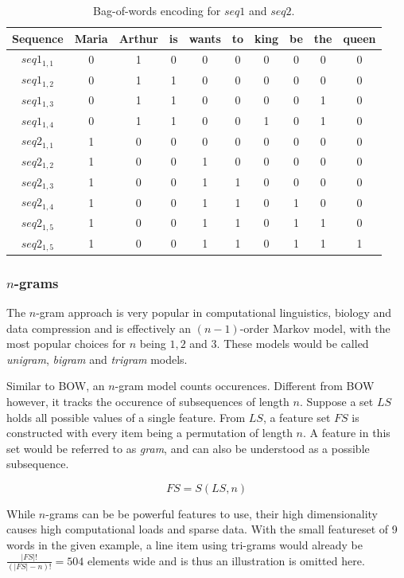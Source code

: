 \begin{table}[]
    \centering
    \begin{tabular}{c|ccccccccc}
        Sequence & Maria & Arthur & is & wants & to & king & be & the & queen\\
        \hline
        $seq1_{1,1}$ & 0 & 1 & 0 & 0 & 0 & 0 & 0 & 0 & 0\\
        $seq1_{1,2}$ & 0 & 1 & 1 & 0 & 0 & 0 & 0 & 0 & 0\\
        $seq1_{1,3}$ & 0 & 1 & 1 & 0 & 0 & 0 & 0 & 1 & 0\\
        $seq1_{1,4}$ & 0 & 1 & 1 & 0 & 0 & 1 & 0 & 1 & 0\\
        \hline
        $seq2_{1,1}$ & 1 & 0 & 0 & 0 & 0 & 0 & 0 & 0 & 0\\
        $seq2_{1,2}$ & 1 & 0 & 0 & 1 & 0 & 0 & 0 & 0 & 0\\
        $seq2_{1,3}$ & 1 & 0 & 0 & 1 & 1 & 0 & 0 & 0 & 0\\
        $seq2_{1,4}$ & 1 & 0 & 0 & 1 & 1 & 0 & 1 & 0 & 0\\
        $seq2_{1,5}$ & 1 & 0 & 0 & 1 & 1 & 0 & 1 & 1 & 0\\
        $seq2_{1,5}$ & 1 & 0 & 0 & 1 & 1 & 0 & 1 & 1 & 1\\
    \end{tabular}
    \caption{Bag-of-words encoding for $seq1$ and $seq2$.}
    \label{tab:bow-encoding}
\end{table}
\subsubsection*{$n$-grams}
The $n$-gram approach is very popular in computational linguistics, biology and data compression and is effectively an $(n-1)$-order Markov model, with the most popular choices for $n$ being $1,2$ and $3$. These models would be called \textit{unigram}, \textit{bigram} and \textit{trigram} models.

Similar to BOW, an $n$-gram model counts occurences. Different from BOW however, it tracks the occurence of subsequences of length $n$. Suppose a set $LS$ holds all possible values of a single feature. From $LS$, a feature set $FS$ is constructed with every item being a permutation of length $n$. A feature in this set would be referred to as \textit{gram}, and can also be understood as a possible subsequence.

$$
FS = S(LS, n)
$$

While $n$-grams can be be powerful features to use, their high dimensionality causes high computational loads and sparse data. With the small featureset of 9 words in the given example, a line item using tri-grams would already be $\frac{|FS|!}{(|FS|-n)!}=504$ elements wide and is thus an illustration is omitted here.

